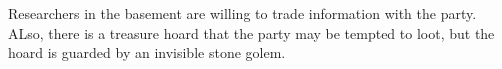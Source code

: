 Researchers in the basement are willing to trade information with the party.
ALso, there is a treasure hoard that the party may be tempted to loot, but the hoard is guarded by an invisible stone golem.